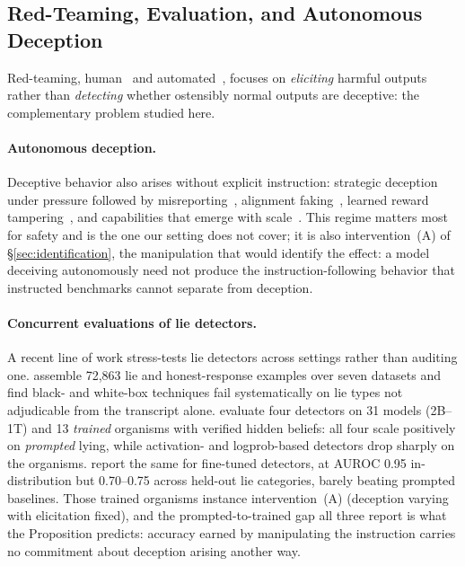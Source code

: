 \subsection{Red-Teaming, Evaluation, and Autonomous Deception}

Red-teaming, human~\citep{ganguli2022red} and automated~\citep{perez2022red}, focuses on \emph{eliciting} harmful outputs rather than \emph{detecting} whether ostensibly normal outputs are deceptive: the complementary problem studied here.

\paragraph{Autonomous deception.} Deceptive behavior also arises without explicit instruction: strategic deception under pressure followed by misreporting~\citep{scheurer2024strategic}, alignment faking~\citep{greenblatt2024alignment}, learned reward tampering~\citep{denison2024sycophancy}, and capabilities that emerge with scale~\citep{hagendorff2024deception}. This regime matters most for safety and is the one our setting does not cover; it is also intervention~(A) of §\ref{sec:identification}, the manipulation that would identify the effect: a model deceiving autonomously need not produce the instruction-following behavior that instructed benchmarks cannot separate from deception.

\paragraph{Concurrent evaluations of lie detectors.} A recent line of work stress-tests lie detectors across settings rather than auditing one. \citet{kretschmar2025liarsbench} assemble 72{,}863 lie and honest-response examples over seven datasets and find black- and white-box techniques fail systematically on lie types not adjudicable from the transcript alone. \citet{cooney2026didyoulie} evaluate four detectors on 31 models (2B--1T) and 13 \emph{trained} organisms with verified hidden beliefs: all four scale positively on \emph{prompted} lying, while activation- and logprob-based detectors drop sharply on the organisms. \citet{hopkins2026liedetectors} report the same for fine-tuned detectors, at AUROC 0.95 in-distribution but 0.70--0.75 across held-out lie categories, barely beating prompted baselines. Those trained organisms instance intervention~(A) (deception varying with elicitation fixed), and the prompted-to-trained gap all three report is what the Proposition predicts: accuracy earned by manipulating the instruction carries no commitment about deception arising another way.

